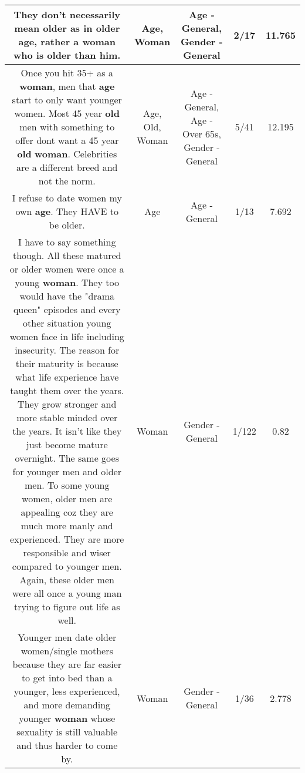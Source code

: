 \documentclass[11pt]{article}
\newlength\mylength
\begin{document}
\begin{center}
\begin{longtable}{|C{.65\mylength}|C{.30\mylength}|C{.12\mylength}|C{.12\mylength}|C{.12\mylength}|}
  \small They don't necessarily mean older as in older \textbf{age}, rather a \textbf{woman} who is older than him.\normalsize   & Age, Woman & Age - General, Gender - General & 2/17 & 11.765 \\  \hline
  \small Once you hit 35+ as a \textbf{woman}, men that \textbf{age} start to only want younger women. Most 45 year \textbf{old} men with something to offer dont want a 45 year \textbf{old} \textbf{woman}. Celebrities are a different breed and not the norm.\normalsize   & Age, Old, Woman & Age - General, Age - Over 65s, Gender - General & 5/41 & 12.195 \\  \hline
  \small I refuse to date women my own \textbf{age}. They HAVE to be older.\normalsize   & Age & Age - General & 1/13 & 7.692 \\  \hline
  \small I have to say something though. All these matured or older women were once a young \textbf{woman}. They too would have the "drama queen" episodes and every other situation young women face in life including insecurity. The reason for their maturity is because what life experience have taught them over the years. They grow stronger and more stable minded over the years. It isn't like they just become mature overnight. The same goes for younger men and older men. To some young women, older men are appealing coz they are much more manly and experienced. They  are more responsible and wiser compared to younger men. Again, these older men were all once a young man trying to figure out life as well.\normalsize   & Woman & Gender - General & 1/122 & 0.82 \\  \hline
  \small Younger men date older women/single mothers because they are far easier to get into bed than a younger, less experienced, and more demanding younger \textbf{woman} whose sexuality is still valuable and thus harder to come by.\normalsize   & Woman & Gender - General & 1/36 & 2.778 \\  \hline

\end{longtable}
\end{center}
\end{document}
